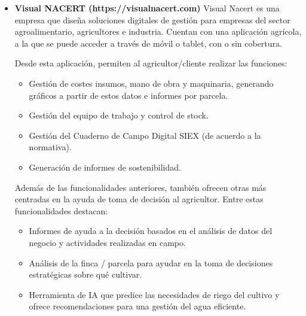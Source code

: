 \begin{itemize}
    \begin{itemize}
        \item Gestión de fincas, cultivos, previsión meteorológica, tratamientos fitosanitarios y recomendaciones personalizadas
        a través del móvil.
        \item Generación de un cuaderno de campo teniendo en cuenta las recomendaciones en materia de Normativa Legal y 
        Protocolos de Calidad.
        \item Generación de planes de abonado y notificaciones a través del correo electrónico al agricultor.
        \item Posibilidad de generar la finca o parcela a través de la cartografía SIGPAC, pudiendo asignar un propietario.
        Gracias a esta funcionalidad los agricultores pueden dar de alta sus fincas y cultivos desde el mapa.
    \end{itemize}

    \item \textbf{Visual NACERT (https://visualnacert.com)}
    \newline
    Visual Nacert es una empresa que diseña soluciones digitales de gestión para empresas del sector agroalimentario,
    agricultores e industria. Cuentan con una aplicación agrícola, a la que se puede acceder a través de móvil o 
    tablet, con o sin cobertura.

    Desde esta aplicación, permiten al agricultor/cliente realizar las funciones:

    \begin{itemize}
        \item Gestión de costes insumos, mano de obra y maquinaria, generando gráficos a partir de estos datos e 
        informes por parcela.
        \item Gestión del equipo de trabajo y control de stock.
        \item Gestión del Cuaderno de Campo Digital SIEX (de acuerdo a la normativa).
        \item Generación de informes de sostenibilidad.
    \end{itemize}

    Además de las funcionalidades anteriores, también ofrecen otras más centradas en la ayuda de toma de decisión al
    agricultor. Entre estas funcionalidades destacan:

    \begin{itemize}
        \item Informes de ayuda a la decisión basados en el análisis de datos del negocio y actividades realizadas 
        en campo.
        \item Análisis de la finca / parcela para ayudar en la toma de decisiones estratégicas sobre qué cultivar.
        \item Herramienta de IA que predice las necesidades de riego del cultivo y ofrece recomendaciones para una
        gestión del agua eficiente.
    \end{itemize}


\end{itemize}
